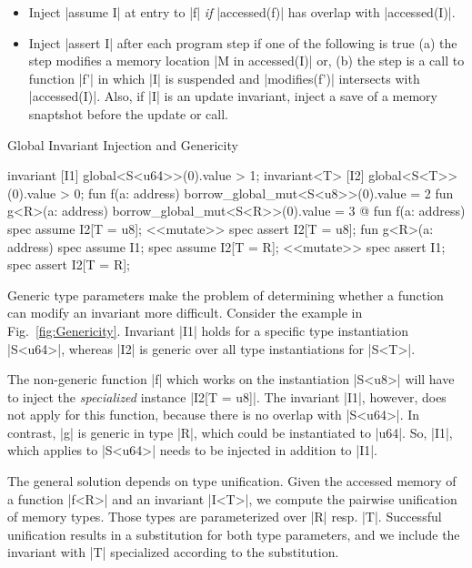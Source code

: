 \begin{itemize}
\item Inject |assume I| at entry to |f| \emph{if} |accessed(f)| has overlap with
  |accessed(I)|.
\item Inject |assert I| after each program step if one of the following is true
  (a) the step modifies a memory location |M in accessed(I)| or, (b) the step is
  a call to function |f'| in which |I| is suspended and |modifies(f')|
  intersects with |accessed(I)|.  Also, if |I| is an update invariant, inject a
  save of a memory snaptshot before the update or call.
\end{itemize}

\vspace{-1ex}

\begin{Figure}
  \caption{Global Invariant Injection and Genericity}
  \label{fig:Genericity}
  \centering
\begin{MoveBox}
  invariant [I1] global<S<u64>>(0).value > 1;
  invariant<T> [I2] global<S<T>>(0).value > 0;
  fun f(a: address) { borrow_global_mut<S<u8>>(0).value = 2 }
  fun g<R>(a: address) { borrow_global_mut<S<R>>(0).value = 3 }
  @\transform@
  fun f(a: address) {
    spec assume I2[T = u8];
    <<mutate>>
    spec assert I2[T = u8];
  }
  fun g<R>(a: address) {
    spec assume I1; spec assume I2[T = R];
    <<mutate>>
    spec assert I1; spec assert I2[T = R];
  }
\end{MoveBox}
\end{Figure}

Generic type parameters make the problem of determining whether a function can
modify an invariant more difficult.  Consider the example in
Fig.~\ref{fig:Genericity}. Invariant |I1| holds for a specific type
instantiation |S<u64>|, whereas |I2| is generic over all type instantiations for
|S<T>|.

The non-generic function |f| which works on the instantiation |S<u8>| will have
to inject the \emph{specialized} instance |I2[T = u8]|. The invariant |I1|,
however, does not apply for this function, because there is no overlap with
|S<u64>|.  In contrast, |g| is generic in type |R|, which could be instantiated
to |u64|. So, |I1|, which applies to |S<u64>| needs to be injected
in addition to |I1|.

The general solution depends on type unification.  Given the accessed memory of
a function |f<R>| and an invariant |I<T>|, we compute the pairwise unification
of memory types. Those types are parameterized over |R| resp. |T|. Successful
unification results in a substitution for both type parameters, and we include
the invariant with |T| specialized according to the substitution.

